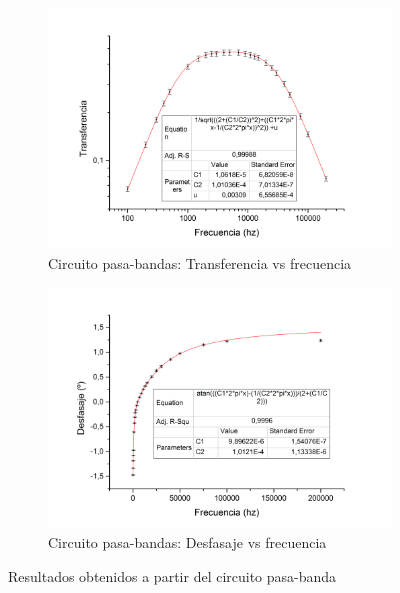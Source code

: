 \documentclass[11pt,a4paper]{article}
\begin{document}
\begin{figure}[h]
\begin{subfigure}{0.5\textwidth}
\includegraphics[scale=0.34]{PBANDA_TRANSFERENCIA}
  \caption{Circuito pasa-bandas: Transferencia vs frecuencia }
  \label{subfig:PBAN.a}
\end{subfigure}
\begin{subfigure}{0.5\textwidth}
\includegraphics[scale=0.34]{PBANDA_DESFASAJE}
  \caption{Circuito pasa-bandas: Desfasaje vs frecuencia}
  \label{subfig:PBAN.b}
\end{subfigure}
  \caption{Resultados obtenidos a partir del circuito pasa-banda}
  \label{fig:PBANDA}
\end{figure}
\end{document}
